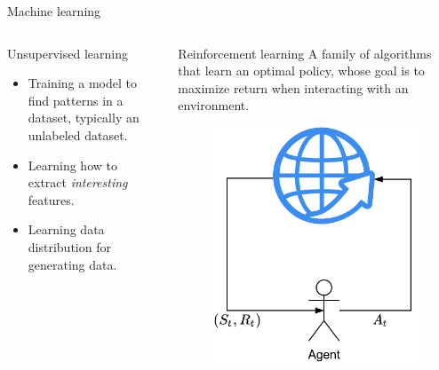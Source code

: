 \begin{frame}[allowframebreaks]{Machine learning}
	\begin{columns}
		\begin{column}{.5\textwidth}
			\begin{block}{Unsupervised learning}
				\begin{itemize}
					\item Training a model to find patterns in a dataset, typically an unlabeled dataset.
					\item Learning how to extract {\em interesting} features.
					\item Learning data distribution for generating data.
				\end{itemize}
			\end{block}
		\end{column}
		\begin{column}{.5\textwidth}
			\begin{block}{Reinforcement learning}
				A family of algorithms that learn an optimal policy, whose goal is to maximize return when interacting with an environment. 
				\begin{figure}
					\includegraphics[width=.4\textwidth, center]{figures/RL_1}
				\end{figure}
			\end{block}
		\end{column}
	\end{columns}
\end{frame}


